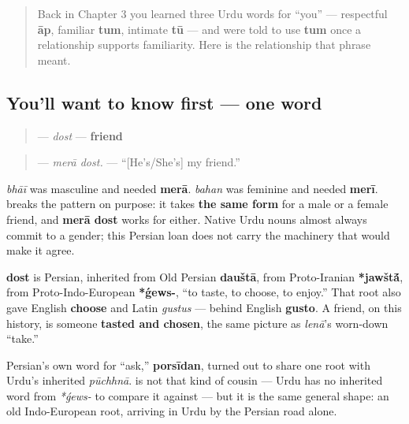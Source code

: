 \label{lesson:UR-C09-dost}



\begin{quote}
Back in Chapter 3 you learned three Urdu words for \textquotedblleft{}you\textquotedblright{} — respectful \textbf{āp}, familiar \textbf{tum}, intimate \textbf{tū} — and were told to use \textbf{tum} once a relationship supports familiarity. Here is the relationship that phrase meant.
\end{quote}

\subsection*{You'll want to know first — one word}
\begin{quote}
\textbf{} — \emph{dost} — \textbf{friend}
\end{quote}

\begin{quote}
\textbf{ } — \emph{merā dost.} — \textquotedblleft{}{[}He's/She's{]} my friend.\textquotedblright{}
\end{quote}

\begin{grammarlens}[title={Grammar Lens: a noun that will not pick a gender}]
\emph{bhāī} was masculine and needed \textbf{merā}. \emph{bahan} was feminine and needed \textbf{merī}. \textbf{} breaks the pattern on purpose: it takes \textbf{the same form} for a male or a female friend, and \textbf{merā dost} works for either. Native Urdu nouns almost always commit to a gender; this Persian loan does not carry the machinery that would make it agree.
\end{grammarlens}

\begin{cousinweb}
\textbf{dost} is Persian, inherited from Old Persian \textbf{dauštā}, from Proto-Iranian \textbf{*jawšt\'{\={a}}}, from Proto-Indo-European \textbf{*ǵews-}, \textquotedblleft{}to taste, to choose, to enjoy.\textquotedblright{} That root also gave English \textbf{choose} and Latin \emph{gustus} — behind English \textbf{gusto}. A friend, on this history, is someone \textbf{tasted and chosen}, the same picture as \emph{lenā}'s worn-down \textquotedblleft{}take.\textquotedblright{}

Persian's own word for \textquotedblleft{}ask,\textquotedblright{} \textbf{porsīdan}, turned out to share one root with Urdu's inherited \emph{pūchhnā}. \textbf{} is not that kind of cousin — Urdu has no inherited word from \emph{*ǵews-} to compare it against — but it is the same general shape: an old Indo-European root, arriving in Urdu by the Persian road alone.
\end{cousinweb}


